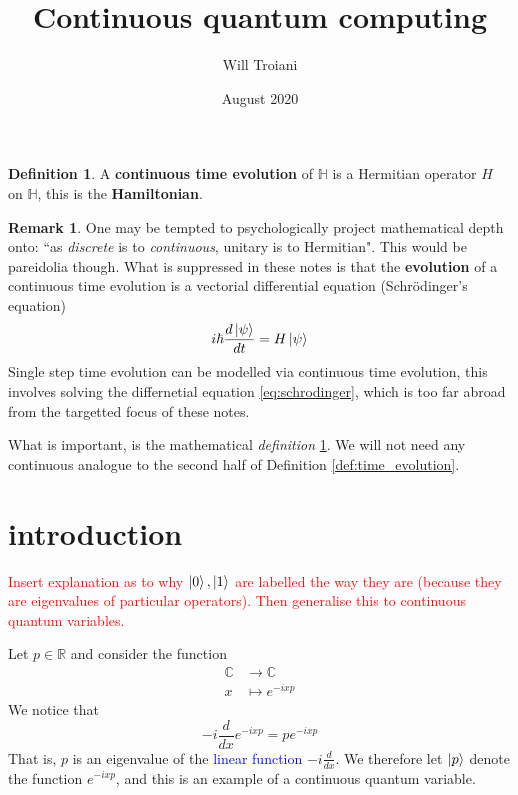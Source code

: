 \documentclass[12pt]{article}
\title{Continuous quantum computing}
\author{Will Troiani}
\date{August 2020}
\theoremstyle{plain}
\theoremstyle{definition}
\newtheorem{defn}[thm]{Definition} %
\newtheorem{remark}[thm]{Remark}
\newcommand{\bb}[1]{\mathbb{#1}}
\newcommand{\lto}{\longrightarrow}
\begin{document}
	\maketitle

\begin{defn}\label{def:cont_time_evolution}
	A \textbf{continuous time evolution} of $\bb{H}$ is a Hermitian operator $H$ on $\bb{H}$, this is the \textbf{Hamiltonian}.
\end{defn}

\begin{remark}
	One may be tempted to psychologically project mathematical depth onto: ``as \emph{discrete} is to \emph{continuous}, unitary is to Hermitian". This would be pareidolia though. What is suppressed in these notes is that the \textbf{evolution} of a continuous time evolution is a vectorial differential equation (Schr\"{o}dinger's equation)
	\begin{equation}\label{eq:schrodinger}
		i\hbar \frac{d\ket{\psi}}{dt} = H\ket{\psi}
	\end{equation}
	Single step time evolution can be modelled via continuous time evolution, this involves solving the differnetial equation \eqref{eq:schrodinger}, which is too far abroad from the targetted focus of these notes.
	
	What is important, is the mathematical \emph{definition} \ref{def:cont_time_evolution}. We will not need any continuous analogue to the second half of Definition \ref{def:time_evolution}.
\end{remark}

\section{introduction}
\textcolor{red}{Insert explanation as to why $\ket{0}, \ket{1}$ are labelled the way they are (because they are eigenvalues of particular operators). Then generalise this to continuous quantum variables.}

Let $p \in \bb{R}$ and consider the function
\begin{align*}
	\bb{C} &\lto \bb{C}\\
	x &\longmapsto e^{-i x p}
\end{align*}
We notice that
\begin{equation}
	-i\frac{d}{dx}e^{-i x p} = p e^{-i x p}
\end{equation}
That is, $p$ is an eigenvalue of the \textcolor{blue}{linear function} $-i\frac{d}{dx}$. We therefore let $\ket{p}$ denote the function $e^{-i x p}$, and this is an example of a continuous quantum variable.
\end{document}
